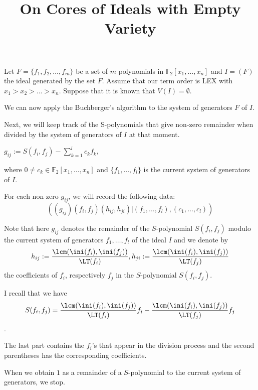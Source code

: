 \documentclass{article}
\title{On Cores of Ideals with Empty Variety}
\theoremstyle{plain}
\begin{document}
\maketitle


Let $F=\{f_1,f_2,\ldots,f_m\}$ be a set of $m$ polynomials in $\mathbb{F}_2[x_1,\ldots,x_n]$ and $I=(F)$ the ideal generated by the set $F$. Assume that our term order is LEX with $x_1>x_2>...>x_n$. Suppose that it is known that $V(I)=\emptyset$.
 
We can now apply the Buchberger's algorithm \cite{HH} to the system of generators $F$ of $I$.
 
Next, we will keep track of the S-polynomials that give non-zero remainder when divided by the system of generators of $I$ at that moment.
\begin{center}
$g_{ij}:= S(f_i,f_j)-\displaystyle\sum_{k=1}^l c_kf_k$,
\end{center}
where $0\neq c_k\in\mathbb{F}_2[x_1,\ldots,x_n]$ and $\{f_1,\ldots,f_l\}$ is the current system of generators of $I$.

For each non-zero $g_{ij}$, we will record the following data:
$$((g_{ij})(f_i,f_j)(h_{ij},h_{ji})| (f_1,\ldots,f_l),(c_1,\ldots,c_l))$$


 Note that here $g_{ij}$ denotes the remainder of the $S$-polynomial $S(f_i,f_j)$ modulo the current system of generators $f_1,\ldots,f_l$ of the ideal $I$ and we denote by 
$$h_{ij}:=\displaystyle\frac{\lcm(\ini(f_i),\ini(f_j))}{\LT(f_i)}, h_{ji}:=\displaystyle\frac{\lcm(\ini(f_i),\ini(f_j))}{\LT(f_j)}$$
the coefficients of $f_i$, respectively $f_j$ in the $S$-polynomial $S(f_i,f_j)$.


I recall that we have $$S(f_i,f_j)=\displaystyle\frac{\lcm(\ini(f_i),\ini(f_j))}{\LT(f_i)}f_i-\frac{\lcm(\ini(f_i),\ini(f_j))}{\LT(f_j)}f_j$$.

The last part contains the $f_i$'s that appear in the division process and the second parentheses has the corresponding coefficients.

 When we obtain $1$ as a remainder of a $S$-polynomial to the current system of generators, we stop.
\end{document}
